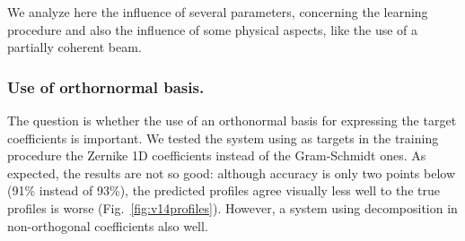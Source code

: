 \documentclass{iucr}
\newcommand{\inred}[1]{{\color{red}#1}}
\begin{document}
We analyze here the influence of several parameters, concerning the learning procedure and also the influence of some physical aspects, like the use of a partially coherent beam.



\subsubsection{Use of orthornormal basis.} The question is whether the use of an orthonormal basis for expressing the target coefficients is important. We tested the system using as targets in the training procedure the Zernike 1D coefficients instead of the Gram-Schmidt ones. As expected, the results are not so good: although 
accuracy is only two points below (91\% instead of 93\%), the predicted profiles agree visually less well to the true profiles is worse (Fig.~\ref{fig:v14profiles}). However, a system using decomposition in non-orthogonal coefficients also well. 
\end{document}
